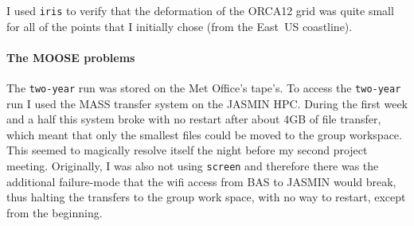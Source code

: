 I used \texttt{iris} to verify that the deformation of the ORCA12 grid was quite small
for all of the points that I initially chose (from the East~US coastline).

\paragraph{The MOOSE problems}

The \texttt{two-year} run was stored on the
Met Office's tape's.
To access the \texttt{two-year} run I used the
MASS transfer system on the JASMIN HPC.
During the first week and a half this system broke
with no restart after about 4GB of file transfer,
which meant that only the smallest files could be
moved to the group workspace. This seemed to magically resolve
itself the night before my second project meeting.
Originally, I was also not using \texttt{screen}
and therefore there was the additional failure-mode
that the wifi access from BAS to JASMIN would break,
thus halting the transfers to the group work space,
with no way to restart, except from the beginning.
